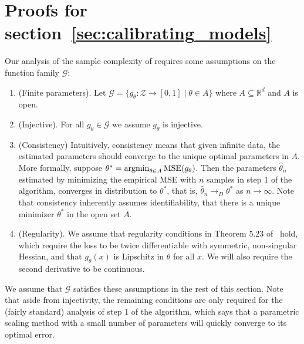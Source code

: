 \newpage
\section{Proofs for section~\ref{sec:calibrating_models}}
\label{sec:calibrating_models_appendix}

\newcommand{\G}[0]{\ensuremath{\mathcal{G}}}

Our analysis of the sample complexity of \ourcal{} requires some assumptions on the function family $\G{}$:

\begin{enumerate}
\item (Finite parameters). Let $\G{} = \{ g_{\theta} : \mathcal{Z} \to [0, 1] \; | \; \theta \in A \}$ where $A \subseteq \mathbb{R}^{d}$ and $A$ is open.
\item (Injective). For all $g_{\theta} \in \G{}$ we assume $g_{\theta}$ is injective.
\item (Consistency) Intuitively, consistency means that given infinite data, the estimated parameters should converge to the unique optimal parameters in $A$.
More formally, suppose $\theta^* = \mathop{\mbox{argmin}}_{\theta \in A} \textup{MSE}(g_{\theta})$.
Then the parameters $\hat{\theta}_n$ estimated by minimizing the empirical MSE with $n$ samples in step 1 of the algorithm, converges in distribution to $\theta^*$, that is, $\hat{\theta}_n \to_D \theta^*$ as $n \to \infty$. Note that consistency inherently assumes identifiability, that there is a unique minimizer $\theta^*$ in the open set $A$.
\item (Regularity). We assume that regularity conditions in Theorem 5.23 of~\cite{vaart98asymptotic} hold, which require the loss to be twice differentiable with symmetric, non-singular Hessian, and that $g_{\theta}(x)$ is Lipschitz in $\theta$ for all $x$. We will also require the second derivative to be continuous.
\end{enumerate}

We assume that $\G{}$ satisfies these assumptions in the rest of this section. Note that aside from injectivity, the remaining conditions are only required for the (fairly standard) analysis of step 1 of the algorithm, which says that a parametric scaling method with a small number of parameters will quickly converge to its optimal error.


